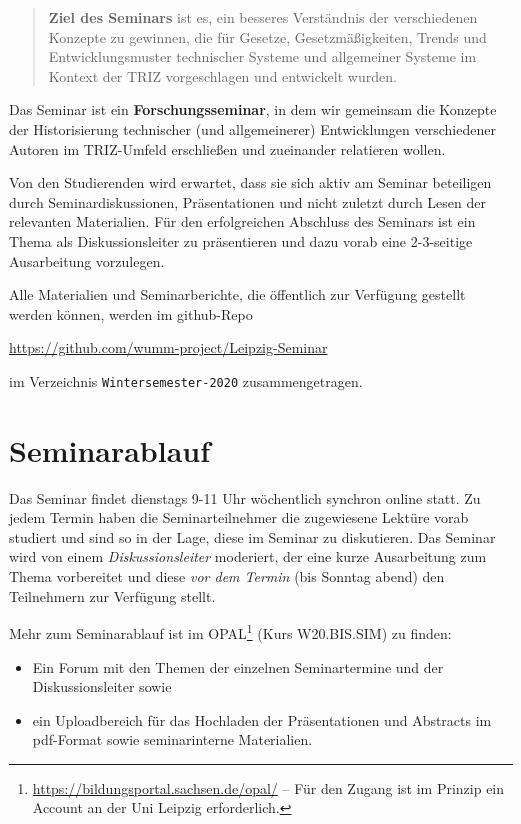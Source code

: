 \documentclass[11pt,a4paper]{article}
\begin{document}
\begin{quote}
  \textbf{Ziel des Seminars} ist es, ein besseres Verständnis der
  verschiedenen Konzepte zu gewinnen, die für Gesetze, Gesetzmäßigkeiten,
  Trends und Entwicklungsmuster technischer Systeme und allgemeiner Systeme
  im Kontext der TRIZ vorgeschlagen und entwickelt wurden.
\end{quote}

Das Seminar ist ein \textbf{Forschungsseminar}, in dem wir gemeinsam die
Konzepte der Historisierung technischer (und allgemeinerer) Entwicklungen
verschiedener Autoren im TRIZ-Umfeld erschließen und zueinander relatieren
wollen.

Von den Studierenden wird erwartet, dass sie sich aktiv am Seminar beteiligen
durch Seminardiskussionen, Präsentationen und nicht zuletzt durch Lesen der
relevanten Materialien.  Für den erfolgreichen Abschluss des Seminars ist ein
Thema als Diskussionsleiter zu präsentieren und dazu vorab eine 2-3-seitige
Ausarbeitung vorzulegen.

Alle Materialien und Seminarberichte, die öffentlich zur Verfügung gestellt
werden können, werden im github-Repo
\begin{center}
  \url{https://github.com/wumm-project/Leipzig-Seminar}
\end{center}
im Verzeichnis \texttt{Wintersemester-2020} zusammengetragen.

\section{Seminarablauf}

Das Seminar findet dienstags 9-11 Uhr wöchentlich synchron online statt.  Zu
jedem Termin haben die Seminarteilnehmer die zugewiesene Lektüre vorab
studiert und sind so in der Lage, diese im Seminar zu diskutieren.  Das
Seminar wird von einem \emph{Diskussionsleiter} moderiert, der eine kurze
Ausarbeitung zum Thema vorbereitet und diese \emph{vor dem Termin} (bis
Sonntag abend) den Teilnehmern zur Verfügung stellt.

Mehr zum Seminarablauf ist im
OPAL\footnote{\url{https://bildungsportal.sachsen.de/opal/} -- Für den Zugang
  ist im Prinzip ein Account an der Uni Leipzig erforderlich.} (Kurs
W20.BIS.SIM) zu finden:
\begin{itemize}
\item Ein Forum mit den Themen der einzelnen Seminartermine und der
  Diskussionsleiter sowie
\item ein Uploadbereich für das Hochladen der Präsentationen und Abstracts im
  pdf-Format sowie seminarinterne Materialien.
\end{itemize}
\end{document}
